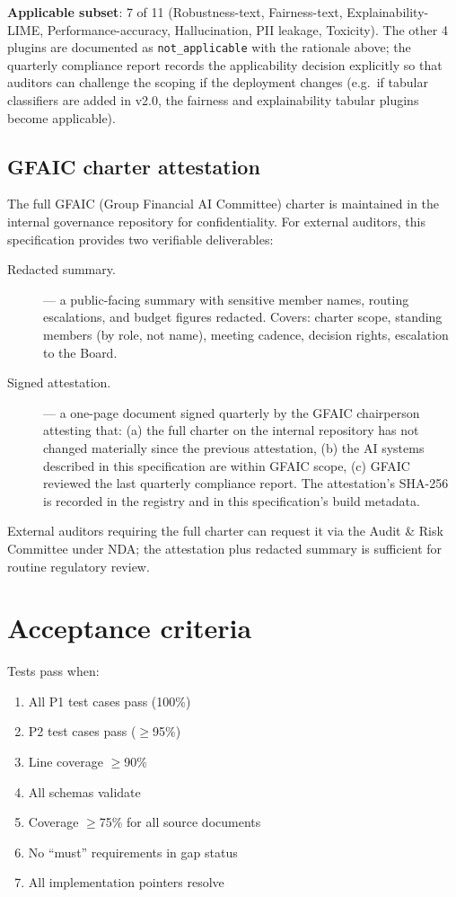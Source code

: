 \noindent
\textbf{Applicable subset}: 7 of 11 (Robustness-text, Fairness-text,
Explainability-LIME, Performance-accuracy, Hallucination, PII
leakage, Toxicity). The other 4 plugins are documented as
\texttt{not\_applicable} with the rationale above; the quarterly
compliance report records the applicability decision explicitly so
that auditors can challenge the scoping if the deployment changes
(e.g.\ if tabular classifiers are added in v2.0, the fairness and
explainability tabular plugins become applicable).

\subsection{GFAIC charter attestation}\label{sec:gfaic-attestation}

The full GFAIC (Group Financial AI Committee) charter is
maintained in the internal governance repository for
confidentiality. For external auditors, this specification
provides two verifiable deliverables:

\begin{description}
  \item[Redacted summary.]
         --- a
        public-facing summary with sensitive member names, routing
        escalations, and budget figures redacted. Covers:
        charter scope, standing members (by role, not name), meeting
        cadence, decision rights, escalation to the Board.
  \item[Signed attestation.]
         ---
        a one-page document signed quarterly by the GFAIC
        chairperson attesting that: (a) the full charter on
        the internal repository has not changed materially
        since the previous attestation, (b) the AI systems
        described in this specification are within GFAIC scope,
        (c) GFAIC reviewed the last quarterly compliance
        report. The attestation's SHA-256 is recorded in the
        registry and in this specification's build metadata.
\end{description}

\noindent
External auditors requiring the full charter can request it via
the Audit \& Risk Committee under NDA; the attestation plus
redacted summary is sufficient for routine regulatory review.

\section{Acceptance criteria}

Tests pass when:
\begin{enumerate}
  \item All P1 test cases pass (100\%)
  \item P2 test cases pass ($\geq$95\%)
  \item Line coverage $\geq$90\%
  \item All schemas validate
  \item Coverage $\geq$75\% for all source documents
  \item No ``must'' requirements in gap status
  \item All implementation pointers resolve
\end{enumerate}